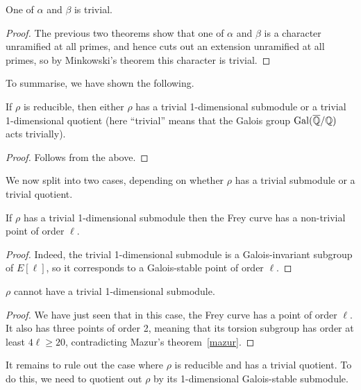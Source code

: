 \begin{corollary}\label{Frey_characters_trivial} One of $\alpha$ and $\beta$ is trivial.
\end{corollary}
\begin{proof}
The previous two theorems show that one of $\alpha$ and $\beta$ is a character unramified at all
primes, and hence cuts out an extension unramified at all primes, so by Minkowski's theorem this character
is trivial. 
\end{proof}

To summarise, we have shown the following.
\begin{theorem}\label{Frey_curve_reducible_structure} If $\rho$ is reducible, then either $\rho$
  has a trivial 1-dimensional submodule or a trivial 1-dimensional quotient (here ``trivial'' means
  that the Galois group $\operatorname{Gal}(\overline{\mathbb{Q}}/\mathbb{Q})$ acts trivially).
\end{theorem}
\begin{proof} Follows from the above.
\end{proof}

We now split into two cases, depending on whether $\rho$ has a trivial submodule or a trivial quotient.

\begin{lemma}\label{Frey_curve_trivial_submodule} If $\rho$ has a trivial 1-dimensional submodule then the
  Frey curve has a non-trivial point of order $\ell$.
\end{lemma}
\begin{proof} Indeed, the trivial 1-dimensional submodule is a Galois-invariant subgroup of $E[\ell]$, so
  it corresponds to a Galois-stable point of order $\ell$.
\end{proof}

\begin{corollary}\label{Frey_curve_no_trivial_submodule} $\rho$ cannot have a trivial 1-dimensional submodule.
\end{corollary}
\begin{proof}
  We have just seen that in this case, the Frey curve has a point of order $\ell$.
  It also has three points of order 2, meaning that its torsion subgroup has order at least
  $4\ell\geq 20$, contradicting Mazur's theorem~\ref{mazur}.
\end{proof}

It remains to rule out the case where $\rho$ is reducible and has a trivial quotient. To do this, we need
to quotient out $\rho$ by its 1-dimensional Galois-stable submodule.

